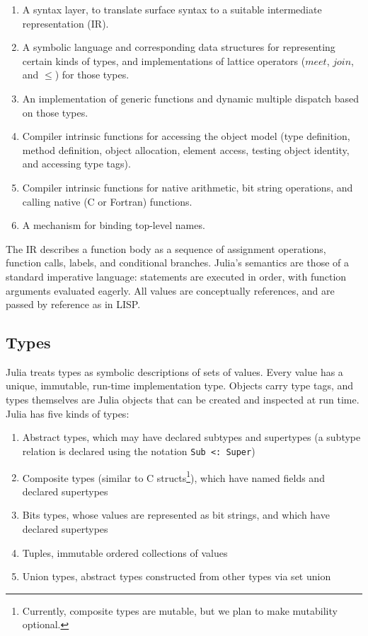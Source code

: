 \documentclass[9pt]{sigplanconf}
\begin{document}
\begin{enumerate}
\item A syntax layer, to translate surface syntax to a suitable
intermediate representation (IR).
\item A symbolic language and corresponding data structures for representing
certain kinds of types, and implementations of lattice operators ($meet$,
$join$, and $\leq$) for those types.
\item An implementation of generic functions and dynamic multiple dispatch
based on those types.
\item Compiler intrinsic functions for accessing the object model
(type definition, method definition, object allocation, element access,
testing object identity, and accessing type tags).
\item Compiler intrinsic functions for native arithmetic, bit string operations,
and calling native (C or Fortran) functions.
\item A mechanism for binding top-level names.
\end{enumerate}

The IR describes a function body as a sequence of assignment operations,
function calls, labels, and conditional branches. Julia's semantics
are those of a standard imperative language: statements are executed in order,
with function arguments evaluated eagerly. All values are conceptually
references, and are passed by reference as in LISP.


\subsection{Types}

Julia treats types as symbolic descriptions of sets of values. Every value has
a unique, immutable, run-time implementation type. Objects carry type tags, and
types themselves are Julia objects that can be created and inspected
at run time.
Julia has five kinds of types:

\begin{enumerate}
\item Abstract types, which may have declared subtypes and supertypes
      (a subtype relation is declared using the notation {\tt Sub~<:~Super})
\item Composite types (similar to C structs\footnote{Currently, composite
types are mutable, but we plan to make mutability optional.}), which have
named fields and declared supertypes
\item Bits types, whose values are represented as bit strings, and which
      have declared supertypes
\item Tuples, immutable ordered collections of values
\item Union types, abstract types constructed from other types via set union
\end{enumerate}
\end{document}
